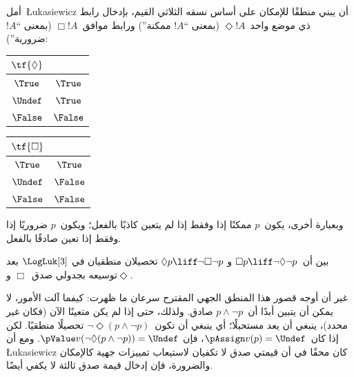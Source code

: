 \documentclass[../../../include/open-logic-section]{subfiles}
\begin{document}
أمل~\L ukasiewicz أن يبني منطقًا للإمكان على أساس نسقه الثلاثي القيم،
بإدخال رابط ذي موضع واحد~$\Diamond !A$ (بمعنى ``$!A$ ممكنة'') ورابط
موافق~$\Box !A$ (بمعنى ``$!A$ ضرورية''):
\begin{center}
  \begin{tabular}{c|c}
    $\tf{\Diamond}$ & \\
    \hline
    $\True$ & $\True$ \\
    $\Undef$ & $\True$ \\
    $\False$ & $\False$
  \end{tabular}
  \quad
  \begin{tabular}{c|c}
    $\tf{\Box}$ & \\
    \hline
    $\True$ & $\True$ \\
    $\Undef$ & $\False$ \\
    $\False$ & $\False$
  \end{tabular}
\end{center}
وبعبارة أخرى، يكون~$p$ ممكنًا إذا وفقط إذا لم يتعين كاذبًا بالفعل؛
ويكون~$p$ ضروريًا إذا وفقط إذا تعين صادقًا بالفعل.

\begin{prob}
  بين أن~$\Box p \liff \lnot\Diamond \lnot p$ و
  $\Diamond p \liff \lnot \Box \lnot p$ تحصيلان منطقيان في
  $\LogLuk[3]$ بعد توسيعه بجدولي صدق~$\Box$ و$\Diamond$.
\end{prob}

غير أن أوجه قصور هذا المنطق الجهي المقترح سرعان ما ظهرت: كيفما آلت
الأمور، لا يمكن أن يتبين أبدًا أن~$p \land \lnot p$ صادق. ولذلك، حتى
إذا لم يكن متعينًا الآن (فكان غير محدد)، ينبغي أن يعد مستحيلًا؛ أي
ينبغي أن تكون~$\lnot \Diamond(p \land \lnot p)$ تحصيلًا منطقيًا.
لكن إذا كان~$\pAssign v(p) = \Undef$، فإن
$\pValue v(\lnot \Diamond(p \land \lnot p)) = \Undef$. ومع أن
\L ukasiewicz كان محقًا في أن قيمتي صدق لا تكفيان لاستيعاب تمييزات
جهية كالإمكان والضرورة، فإن إدخال قيمة صدق ثالثة لا يكفي أيضًا.
\end{document}
